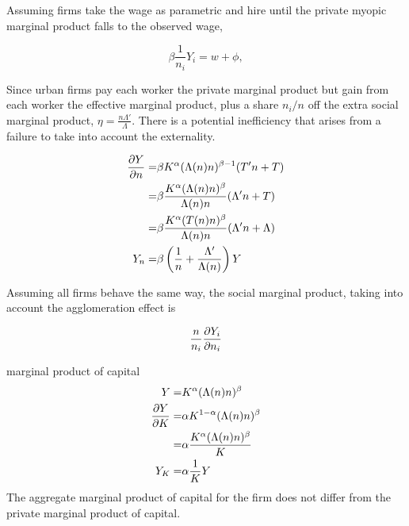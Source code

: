 Assuming firms take the wage as parametric and hire until the private myopic marginal product falls to the observed wage, %

		\[  \beta\frac{1}{n_i} Y_i =    w+\phi , \]

Since urban firms pay each worker the private marginal product but gain from each worker the effective marginal product,   plus a share $n_i/n$ off the extra social marginal product, $\eta=\frac{n\Lambda'}{\Lambda}$.  There is a potential  inefficiency that arises from a failure to take into account the externality. 

%

\begin{align} 
\frac{\partial Y}{\partial n}=&\beta K^{\alpha }(\Lambda(n)n)^{\beta-1 }(T'n+T )  \nonumber \\
		=&\beta  \frac{K^{\alpha} (\Lambda(n)n)^{\beta}}  {\Lambda(n)n} (\Lambda'n+T)  \nonumber \\
		=&\beta  \frac{K^{\alpha} (T(n)n)^{\beta}}  {\Lambda(n)n} (\Lambda'n+\Lambda)  \nonumber \\
	Y_n	=&\beta \left( \frac{1}{n}+ \frac{\Lambda'}{\Lambda(n)} \right)	Y
\end{align}

Assuming all firms behave the same way, the social marginal product, taking into account the agglomeration effect is  

\[ \frac{n}{n_i} \frac{\partial Y_i}{\partial n_i} \]


 marginal product of capital
\begin{align}
Y=&K^{\alpha }(\Lambda(n)n)^{\beta}   \nonumber  \\
\frac{\partial Y}{\partial K}=&\alpha K^{1-\alpha }(\Lambda(n)n)^{\beta }  \nonumber \\
		=&\alpha \frac{K^{\alpha}(\Lambda(n)n)^{\beta }}{K}  \nonumber \\
	Y_K	=&\alpha\frac{1}{K} Y  \label{EQ:mpk}		
\end{align}
The aggregate marginal product of capital for the firm does not differ from the private marginal product of capital.


